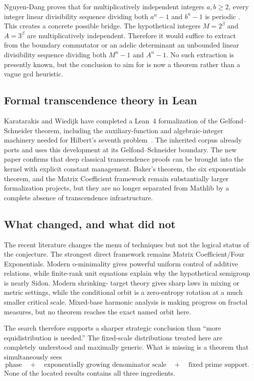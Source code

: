 \documentclass[11pt,oneside]{article}
\theoremstyle{definition}
\theoremstyle{remark}
\begin{document}
Nguyen-Dang proves that for multiplicatively independent integers $a,b\ge2$, every integer
linear divisibility sequence dividing both $a^n-1$ and $b^n-1$ is periodic
\cite{NguyenDang2026}.  This creates a concrete possible bridge.  The hypothetical integers
$M=2^\beta$ and $A=3^\beta$ are multiplicatively independent.  Therefore it would suffice to
extract from the boundary commutator or an adelic determinant an unbounded linear divisibility
sequence dividing both $M^n-1$ and $A^n-1$.  No such extraction is presently known, but the
conclusion to aim for is now a theorem rather than a vague gcd heuristic.

\subsection{Formal transcendence theory in Lean}

Karatarakis and Wiedijk have completed a Lean~4 formalization of the
Gelfond--Schneider theorem, including the auxiliary-function and algebraic-integer machinery
needed for Hilbert's seventh problem~\cite{KaratarakisWiedijk2026}.  The inherited corpus
already ports and uses this development at its Gelfond--Schneider boundary.  The new paper
confirms that deep classical transcendence proofs can be brought into the kernel with explicit
constant management.  Baker's theorem, the six exponentials theorem, and the Matrix
Coefficient framework remain substantially larger formalization projects, but they are no
longer separated from Mathlib by a complete absence of transcendence infrastructure.

\subsection{What changed, and what did not}

The recent literature changes the menu of techniques but not the logical status of the
conjecture.  The strongest direct framework remains Matrix Coefficient/Four Exponentials.
Modern o-minimality gives powerful uniform control of additive relations, while finite-rank
unit equations explain why the hypothetical semigroup is nearly Sidon.  Modern shrinking-
target theory gives sharp laws in mixing or metric settings, while the conditional orbit is a
zero-entropy rotation at a much smaller critical scale.  Mixed-base harmonic analysis is
making progress on fractal measures, but no theorem reaches the exact named orbit here.

The search therefore supports a sharper strategic conclusion than ``more equidistribution is
needed.''  The fixed-scale distributions treated here are completely understood and maximally generic.
What is missing is a theorem that simultaneously sees
\begin{equation}
 \text{phase} \quad+\quad \text{exponentially growing denominator scale}
 \quad+\quad \text{fixed prime support}.
 \label{mt:eq-missing-triple}
\end{equation}
None of the located results contains all three ingredients.
\end{document}
